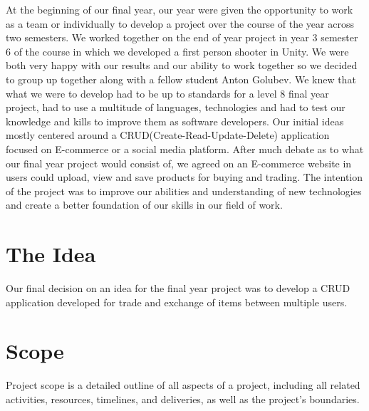 At the beginning of our final year, our year were given the opportunity to work as a team or individually to develop a project over the course of the year across two semesters. We worked together on the end of year project in year 3 semester 6 of the course in which we developed a first person shooter in Unity. We were both very happy with our results and our ability to work together so we decided to group up together along with a fellow student Anton Golubev. We knew that what we were to develop had to be up to standards for a level 8 final year project, had to use a multitude of languages, technologies and had to test our knowledge and kills to improve them as software developers. Our initial ideas mostly centered around a CRUD(Create-Read-Update-Delete) application focused on E-commerce or a social media platform. After much debate as to what our final year project would consist of, we agreed on an E-commerce website in users could upload, view and save products for buying and trading. The intention of the project was to improve our abilities and understanding of new technologies and create a better foundation of our skills in our field of work.

\section{The Idea}
Our final decision on an idea for the final year project was to develop a CRUD application developed for trade and exchange of items between multiple users. 

\section{Scope}
Project scope is a detailed outline of all aspects of a project, including all related activities, resources, timelines, and deliveries, as well as the project's boundaries. 




